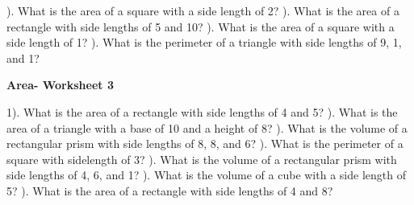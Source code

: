 \documentclass{article}%
\begin{document}
). What is the area of a square with a side length of 2?%
\newline%
\newline%
). What is the area of a rectangle with side lengths of 5 and 10?%
\newline%
\newline%
). What is the area of a square with a side length of 1?%
\newline%
\newline%
). What is the perimeter of a triangle with side lengths of 9, 1, and 1?%
\newline%
\newline%
\newline%
\pagebreak%
\large%
\begin{center}%
\textbf{Area- Worksheet 3}%
\newline%
\end{center} \normalsize%
1). What is the area of a rectangle with side lengths of 4 and 5?%
\newline%
\newline%
). What is the area of a triangle with a base of 10 and a height of 8?%
\newline%
\newline%
). What is the volume of a rectangular prism with side lengths of 8, 8, and 6?%
\newline%
\newline%
). What is the perimeter of a square with sidelength of 3?%
\newline%
\newline%
). What is the volume of a rectangular prism with side lengths of 4, 6, and 1?%
\newline%
\newline%
). What is the volume of a cube with a side length of 5?%
\newline%
\newline%
). What is the area of a rectangle with side lengths of 4 and 8?%
\newline%
\newline%
\end{document}
